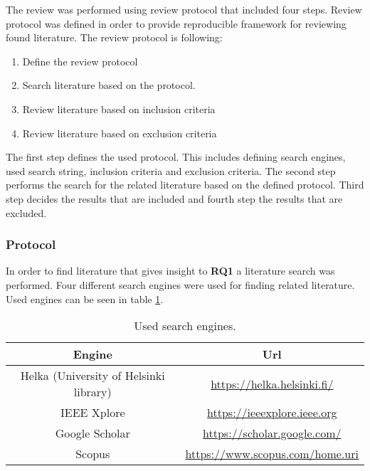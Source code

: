 The review was performed using review protocol that included four steps.
Review protocol was defined in order to provide reproducible framework for reviewing found literature.
The review protocol is following:
\begin{enumerate}
    \item Define the review protocol
    \item Search literature based on the protocol.
    \item Review literature based on inclusion criteria
    \item Review literature based on exclusion criteria
\end{enumerate}

The first step defines the used protocol.
This includes defining search engines, used search string, inclusion criteria and exclusion criteria.
The second step performs the search for the related literature based on the defined protocol.
Third step decides the results that are included and fourth step the results that are excluded.
\subsubsection{Protocol}
In order to find literature that gives insight to \textbf{RQ1} a literature search was performed.
Four different search engines were used for finding related literature.
Used engines can be seen in table \ref{table:literature:searchEngines}.

\begin{table}[h!]
    \begin{tabular}{| c | c |} 
        \hline
        Engine
        & Url
        \\ [0.5ex] \hline
        
        Helka (University of Helsinki library)
        & \url{https://helka.helsinki.fi/}
        \\ \hline
        
        IEEE Xplore
        & \url{https://ieeexplore.ieee.org}
        \\ \hline
        
        Google Scholar
        & \url{https://scholar.google.com/}
        \\ \hline

        Scopus
        & \url{https://www.scopus.com/home.uri}
        \\ \hline
    \end{tabular}    
    \caption{Used search engines.}
    \label{table:literature:searchEngines}
\end{table}

